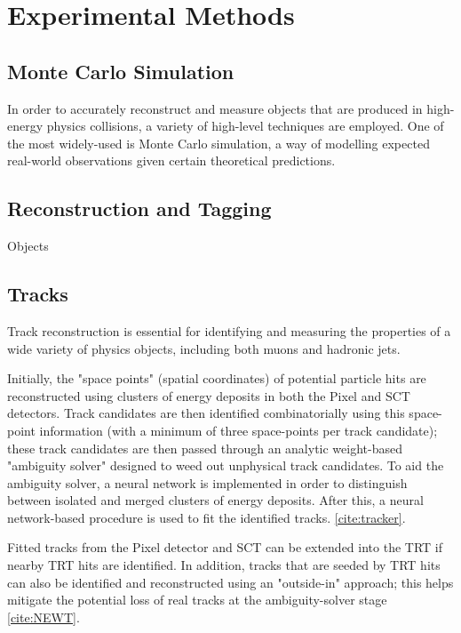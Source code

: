 \section{Experimental Methods} \label{sec:methods} 

\subsection{Monte Carlo Simulation} \label{sec:MC} 
In order to accurately reconstruct and measure objects that are produced in high-energy physics collisions, a variety of high-level techniques are employed. One of the most widely-used is Monte Carlo simulation, a way of modelling expected real-world observations given certain theoretical predictions. 



\subsection{Reconstruction and Tagging} \label{sec:Reco} 

Objects 

\subsection{Tracks} \label{sec:Tracks} 

Track reconstruction is essential for identifying and measuring the properties of a wide variety of physics objects, including both muons and hadronic jets.

Initially, the "space points" (spatial coordinates) of potential particle hits are reconstructed using clusters of energy deposits in both the Pixel and SCT detectors. Track candidates are then identified combinatorially using this space-point information (with a minimum of three space-points per track candidate); these track candidates are then passed through an analytic weight-based "ambiguity solver" designed to weed out unphysical track candidates. To aid the ambiguity solver, a neural network is implemented in order to distinguish between isolated and merged clusters of energy deposits. After this, a neural network-based procedure is used to fit the identified tracks. \ref{cite:tracker}.

Fitted tracks from the Pixel detector and SCT can be extended into the TRT if nearby TRT hits are identified. In addition, tracks that are seeded by TRT hits can also be identified and reconstructed using an "outside-in" approach; this helps mitigate the potential loss of real tracks at the ambiguity-solver stage \ref{cite:NEWT}.

